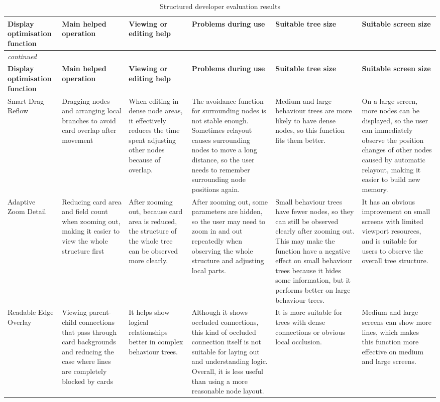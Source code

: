 \documentclass[11pt,a4paper,oneside,extrafontsizes]{memoir}
\begin{document}
\begin{center}
\begin{longtable}{@{}p{} p{} p{} p{} p{} p{}@{}}
\caption{Structured developer evaluation results}\label{tab:developer-evaluation}\\
\toprule
\textbf{Display optimisation function} & \textbf{Main helped operation} & \textbf{Viewing or editing help} & \textbf{Problems during use} & \textbf{Suitable tree size} & \textbf{Suitable screen size} \\
\midrule
\endfirsthead
\multicolumn{6}{l}{\itshape continued}\\
\toprule
\textbf{Display optimisation function} & \textbf{Main helped operation} & \textbf{Viewing or editing help} & \textbf{Problems during use} & \textbf{Suitable tree size} & \textbf{Suitable screen size} \\
\midrule
\endhead
Smart Drag Reflow & Dragging nodes and arranging local branches to avoid card overlap after movement & When editing in dense node areas, it effectively reduces the time spent adjusting other nodes because of overlap. & The avoidance function for surrounding nodes is not stable enough. Sometimes relayout causes surrounding nodes to move a long distance, so the user needs to remember surrounding node positions again. & Medium and large behaviour trees are more likely to have dense nodes, so this function fits them better. & On a large screen, more nodes can be displayed, so the user can immediately observe the position changes of other nodes caused by automatic relayout, making it easier to build new memory. \\
Adaptive Zoom Detail & Reducing card area and field count when zooming out, making it easier to view the whole structure first & After zooming out, because card area is reduced, the structure of the whole tree can be observed more clearly. & After zooming out, some parameters are hidden, so the user may need to zoom in and out repeatedly when observing the whole structure and adjusting local parts. & Small behaviour trees have fewer nodes, so they can still be observed clearly after zooming out. This may make the function have a negative effect on small behaviour trees because it hides some information, but it performs better on large behaviour trees. & It has an obvious improvement on small screens with limited viewport resources, and is suitable for users to observe the overall tree structure. \\
Readable Edge Overlay & Viewing parent-child connections that pass through card backgrounds and reducing the case where lines are completely blocked by cards & It helps show logical relationships better in complex behaviour trees. & Although it shows occluded connections, this kind of occluded connection itself is not suitable for laying out and understanding logic. Overall, it is less useful than using a more reasonable node layout. & It is more suitable for trees with dense connections or obvious local occlusion. & Medium and large screens can show more lines, which makes this function more effective on medium and large screens. \\

\end{longtable}
\end{center}
\end{document}
